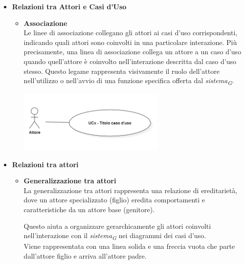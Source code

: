 \begin{itemize}
    \item \textbf{Relazioni tra Attori e Casi d'Uso}
    
    \begin{itemize}
        \item \textbf{Associazione} \\
        Le linee di associazione collegano gli attori ai casi d'uso corrispondenti, indicando quali attori sono coinvolti in una particolare interazione. Più precisamente, una linea di associazione collega un attore a un caso d'uso quando quell'attore è coinvolto nell'interazione descritta dal caso d'uso stesso. Questo legame rappresenta visivamente il ruolo dell'attore nell'utilizzo o nell'avvio di una funzione specifica offerta dal \textit{sistema}\textsubscript{\textit{G}}.
        
        \begin{minipage}[H]{\linewidth}
            \centering
            \includegraphics[width=0.6\textwidth]{../Images/NormeDiProgetto/Associazione.PNG}
        \end{minipage}
    \end{itemize}

    \vspace{0.4cm}

    \item \textbf{Relazioni tra attori}
    \begin{itemize}
        \item \textbf{Generalizzazione tra attori} \\
        La generalizzazione tra attori rappresenta una relazione di ereditarietà, dove un attore specializzato (figlio) eredita comportamenti e caratteristiche da un attore base (genitore).

        Questo aiuta a organizzare gerarchicamente gli attori coinvolti nell'interazione con il \textit{sistema}\textsubscript{\textit{G}} nei diagrammi dei casi d'uso. \\
        Viene rappresentata con una linea solida e una freccia vuota che parte dall'attore figlio e arriva all'attore padre.


\end{itemize}
\end{itemize}
